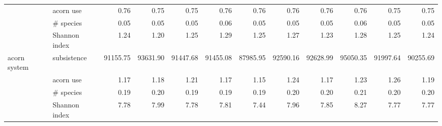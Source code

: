\begin{table}[ht]
\begin{tabular}{llrrrrrrrrrr}
   & acorn use & 0.76 & 0.75 & 0.75 & 0.76 & 0.76 & 0.76 & 0.76 & 0.76 & 0.75 & 0.75 \\ 
   & # species & 0.05 & 0.05 & 0.05 & 0.06 & 0.05 & 0.05 & 0.05 & 0.06 & 0.05 & 0.05 \\ 
   & Shannon index & 1.24 & 1.20 & 1.25 & 1.29 & 1.25 & 1.27 & 1.23 & 1.28 & 1.25 & 1.24 \\ 
  acorn system & subsistence & 91155.75 & 93631.90 & 91447.68 & 91455.08 & 87985.95 & 92590.16 & 92628.99 & 95050.35 & 91997.64 & 90255.69 \\ 
   & acorn use & 1.17 & 1.18 & 1.21 & 1.17 & 1.15 & 1.24 & 1.17 & 1.23 & 1.26 & 1.19 \\ 
   & # species & 0.19 & 0.20 & 0.19 & 0.19 & 0.19 & 0.20 & 0.20 & 0.21 & 0.20 & 0.20 \\ 
   & Shannon index & 7.78 & 7.99 & 7.78 & 7.81 & 7.44 & 7.96 & 7.85 & 8.27 & 7.77 & 7.77 \\ 
   \hline
\end{tabular}
\end{table}
